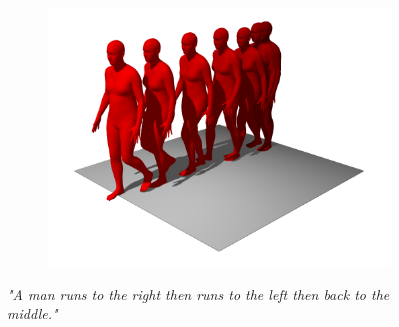 \begin{figure}[H]
\begin{subfigure}{0.32\linewidth}
        \includegraphics[width=\linewidth]{figures/results/single-runs3.png}
    \end{subfigure}
    \caption{\textit{"A man runs to the right then runs to the left then back to the middle."}}
    \label{fig:single-runs}
\end{figure}

